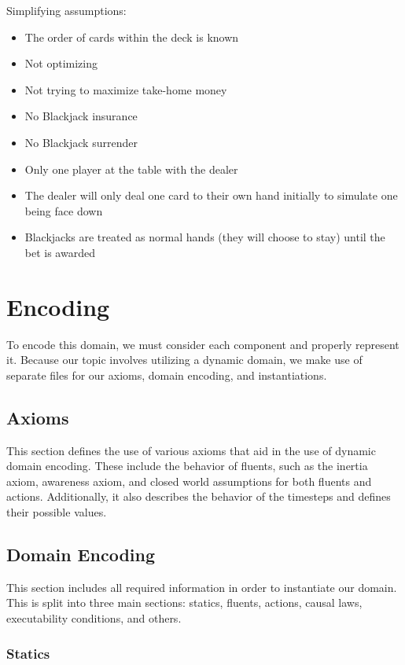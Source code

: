 \documentclass{article}
\begin{document}
Simplifying assumptions:
\begin{itemize}
    \item The order of cards within the deck is known
    \item Not optimizing
    \item Not trying to maximize take-home money
    \item No Blackjack insurance
    \item No Blackjack surrender
    \item Only one player at the table with the dealer
    \item The dealer will only deal one card to their own hand initially to simulate one being face down
    \item Blackjacks are treated as normal hands (they will choose to stay) until the bet is awarded
\end{itemize}

\section{Encoding}

To encode this domain, we must consider each component and properly represent it.
Because our topic involves utilizing a dynamic domain, we make use of separate files for our axioms,
domain encoding, and instantiations.


\subsection{Axioms}

This section defines the use of various axioms that aid in the use of dynamic domain encoding.
These include the behavior of fluents, such as the inertia axiom, awareness axiom, and closed world assumptions for both fluents and actions.
Additionally, it also describes the behavior of the timesteps and defines their possible values.

\subsection{Domain Encoding}

This section includes all required information in order to instantiate our domain.
This is split into three main sections: statics, fluents, actions, causal laws, executability
conditions, and others.

\subsubsection{Statics}
\end{document}
